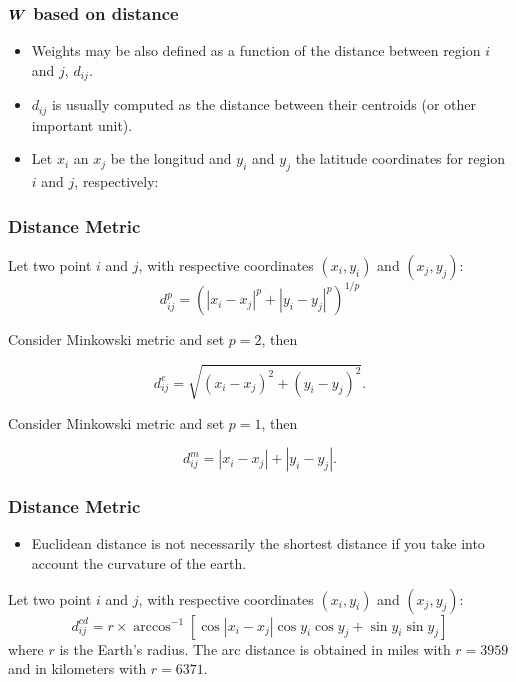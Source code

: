 \documentclass[english,10pt]{beamer}\usepackage[]{graphicx}\usepackage[]{xcolor}
\begin{document}
\begin{frame}
  \frametitle{$\bm W$ based on distance}
    \begin{itemize}
      \item Weights may be also defined as a function of the distance between region $i$ and $j$, $d_{ij}$.
      \item $d_{ij}$ is usually computed as the distance between their centroids (or other important unit).
      \item Let $x_i$ an $x_j$ be the longitud and $y_i$ and $y_j$ the latitude coordinates for region $i$ and $j$, respectively:
    \end{itemize}
\end{frame}

\begin{frame}
  \frametitle{Distance Metric}
  \begin{definition}
    Let two point $i$ and $j$, with respective coordinates $(x_i, y_i)$ and $(x_j, y_j)$:
    \begin{equation}
  d_{ij}^p = \left(\left|x_i - x_j\right|^p + \left|y_i - y_j\right|^p\right)^{1/p}
\end{equation}
  \end{definition}
  
    \begin{definition}
    Consider Minkowski metric and set $p = 2$, then
    
    \begin{equation}
  d_{ij}^e = \sqrt{(x_i - x_j)^2 + (y_i - y_j)^2}.
\end{equation}
  \end{definition}
  
\begin{definition}
  Consider Minkowski metric and set $p = 1$, then
  
  \begin{equation}
   d_{ij}^m = \left|x_i - x_j\right| + \left|y_i - y_j\right|.
\end{equation}
\end{definition}
\end{frame}

\begin{frame}
  \frametitle{Distance Metric}
    \begin{itemize}
      \item Euclidean distance is not necessarily the shortest distance if you take into account the curvature of the earth. 
    \end{itemize}
    
    \begin{definition}
    Let two point $i$ and $j$, with respective coordinates $(x_i, y_i)$ and $(x_j, y_j)$:
    \begin{equation}
d_{ij}^{cd} = r \times \arccos^{-1}\left[\cos|x_i - x_j| \cos y_i \cos y_j + \sin y_i \sin y_j \right]
\end{equation}
%
where $r$ is the Earth's radius. The arc distance is obtained in miles with $r = 3959$ and in kilometers with $r = 6371$.
    \end{definition}
\end{frame}
\end{document}

